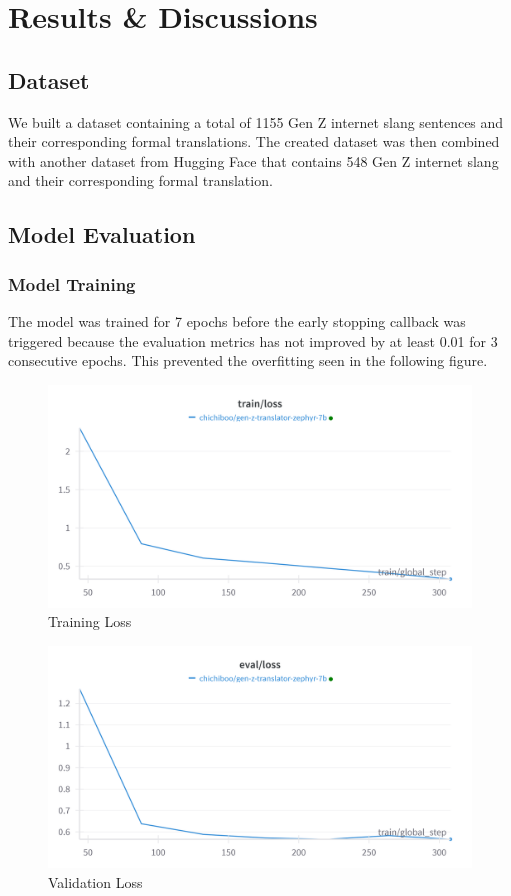 \chapter{Results \& Discussions}
\section{Dataset}
We built a dataset containing a total of 1155 Gen Z internet slang sentences and their corresponding formal translations. The created dataset was then combined with another dataset from Hugging Face that contains 548 Gen Z internet slang and their corresponding formal translation.
 
\section{Model Evaluation}
\subsection{Model Training}
The model was trained for 7 epochs before the early stopping callback was triggered because the evaluation metrics has not improved by at least 0.01 for 3 consecutive epochs. This prevented the overfitting seen in the following figure. 

\begin{figure}
	\caption{Training Loss}
	\centering
	\includegraphics[scale=0.2]{figures/TrainLoss.png}
\end{figure}
\begin{figure}
	\caption{Validation Loss}
	\centering
	\includegraphics[scale=0.2]{figures/EvaluationLoss.png}
\end{figure}

